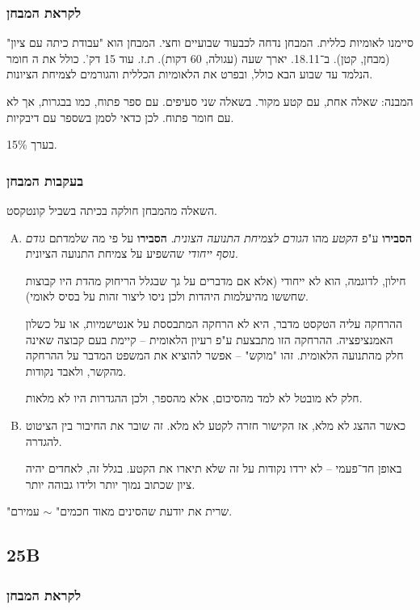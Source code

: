 \documentclass[a4paper]{book}
\begin{document}
	\subsubsection{לקראת המבחן}
	סיימנו לאומיות כללית. המבחן נדחה לכבעוד שבועיים וחצי. המבחן הוא "עבודת כיתה עם ציון" (מבחן, קטן). ב־18.11. יארך שעה (עגולה, 60 דקות). ת.ז. עוד 15 דק'. כולל את ה חומר הנלמד עד שבוע הבא כולל, ובפרט את הלאומיות הכללית והגורמים לצמיחת הציונות.
	
	המבנה: שאלה אחת, עם קטע מקור. בשאלה שני סעיפים. עם ספר פתוח, כמו בבגרות, אך לא עם חומר פתוח. לכן כדאי לסמן בשספר עם דיבקיות. 
	
	בערך 15\%. 
	
	\subsubsection{בעקבות המבחן}
	השאלה מהמבחן חולקה בכיתה בשביל קונטקסט. 
	\begin{enumerate}[A.]
		\item \textbf{הסבירו} ע"פ \textit{הקטע} מהו \textit{הגורם לצמיחת התנועה הצונית}. \textbf{הסבירו} על פי מה שלמדתם \textit{גודם נוסף ייחודי} שהשפיע על צמיחת התנועה הציונית. 
		
		חילון, לדוגמה, הוא לא ייחודי (אלא אם מדברים על גך שבגלל הריחוק מהדת היו קבוצות שחששו מהיעלמות היהדות ולכן ניסו ליצור זהות על בסיס לאומי). 
		
		ההרחקה עליה הטקסט מדבר, היא לא הרחקה המתבססת על אנטישמיות, או על כשלון האמנציפציה. ההרחקה הזו מתבצעת ע"פ רעיון הלאומית – קיימת בעם קבוצה שאינה חלק מהתנועה הלאומית. זהו "מוקש" – אפשר להוציא את המשפט המדבר על ההרחקה מהקשר, ולאבד נקודות. 
		
		חלק לא מובטל לא למד מהסיכום, אלא מהספר, ולכן ההגדרות היו לא מלאות. 
		
		\item כאשר ההצג לא מלא, אז הקישור חזרה לקטע לא מלא. זה שובר את החיבור בין הציטוט להגדרה. 
		
		באופן חד־פעמי – לא ירדו נקודות על זה שלא תיארו את הקטע. בגלל זה, לאחדים יהיה ציון שכתוב נמוך יותר ולידו גבוהה יותר. 
		
	\end{enumerate}
	
	"שרית את יודעת שהסינים מאוד חכמים" $\sim$ עמירם. 
	
	\subsection{25B}
	\subsubsection{לקראת המבחן}
	
\end{document}
